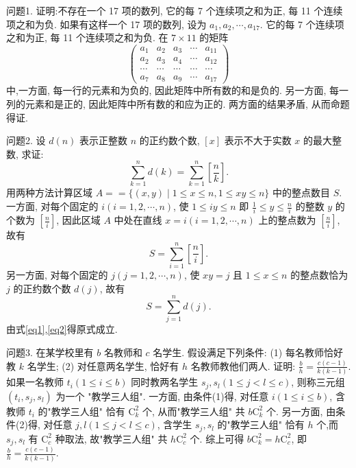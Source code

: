
问题1. 证明:不存在一个 17 项的数列, 它的每 7 个连续项之和为正, 每 11 个连续项之和为负.
如果有这样一个 17 项的数列, 设为 $a_1, a_2, \cdots, a_{17}$. 它的每 7 个连续项之和为正, 每 11 个连续项之和为负.
在 $7 \times 11$ 的矩阵
$$
\left(\begin{array}{ccccc}
a_1 & a_2 & a_3 & \cdots & a_{11} \\
a_2 & a_3 & a_4 & \cdots & a_{12} \\
\cdots & \cdots & \cdots & \cdots & \cdots \\
a_7 & a_8 & a_9 & \cdots & a_{17}
\end{array}\right)
$$
中,一方面, 每一行的元素和为负的, 因此矩阵中所有数的和是负的.
另一方面, 每一列的元素和是正的, 因此矩阵中所有数的和应为正的.
两方面的结果矛盾, 从而命题得证.



问题2. 设 $d(n)$ 表示正整数 $n$ 的正约数个数, $[x]$ 表示不大于实数 $x$ 的最大整数, 求证:
$$
\sum_{k=1}^n d(k)=\sum_{k=1}^n\left[\frac{n}{k}\right] .
$$
用两种方法计算区域 $A==\{(x, y) \mid 1 \leqslant x \leqslant n, 1 \leqslant x y \leqslant n\}$ 中的整点数目 $S$.
一方面, 对每个固定的 $i(i=1,2, \cdots, n)$, 使 $1 \leqslant i y \leqslant n$ 即 $\frac{1}{i} \leqslant y \leqslant \frac{n}{i}$ 的整数 $y$ 的个数为 $\left[\frac{n}{i}\right]$, 因此区域 $A$ 中处在直线 $x=i(i=1,2, \cdots, n)$ 上的整点数为 $\left[\frac{n}{i}\right]$, 故有
$$
S=\sum_{i=1}^n\left[\frac{n}{i}\right] . \label{eq1}
$$
另一方面, 对每个固定的 $j(j=1,2, \cdots, n)$, 使 $x y=j$ 且 $1 \leqslant x \leqslant n$ 的整点数恰为 $j$ 的正约数个数 $d(j)$, 故有
$$
S=\sum_{j=1}^n d(j) . \label{eq2}
$$
由式\ref{eq1},\ref{eq2}得原式成立.



问题3. 在某学校里有 $b$ 名教师和 $c$ 名学生.
假设满足下列条件:
(1) 每名教师恰好教 $k$ 名学生;
(2) 对任意两名学生, 恰好有 $h$ 名教师教他们两人.
证明: $\frac{b}{h}=\frac{c(c-1)}{k(k-1)}$. 
如果一名教师 $t_i(1 \leqslant i \leqslant b)$ 同时教两名学生 $s_j, s_l(1 \leqslant j<l \leqslant c)$, 则称三元组 $\left(t_i, s_j, s_l\right)$ 为一个 "教学三人组".
一方面, 由条件(1)得, 对任意 $i(1 \leqslant i \leqslant b)$, 含教师 $t_i$ 的"教学三人组" 恰有 $\mathrm{C}_k^2$ 个, 从而"教学三人组" 共 $b \mathrm{C}_k^2$ 个.
另一方面, 由条件(2)得, 对任意 $j, l(1 \leqslant j<l \leqslant c)$, 含学生 $s_j, s_l$ 的"教学三人组" 恰有 $h$ 个,而 $s_j, s_l$ 有 $\mathrm{C}_c^2$ 种取法, 故"教学三人组" 共 $h \mathrm{C}_c^2$ 个.
综上可得 $b \mathrm{C}_k^2=h \mathrm{C}_c^2$, 即 $\frac{b}{h}=\frac{c(c-1)}{k(k-1)}$.



